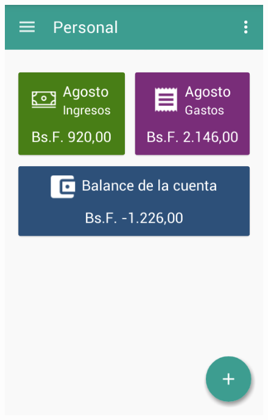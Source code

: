 \begin{figure}[ht]
\centering
\begin{minipage}{.5\textwidth}
  \centering
  \includegraphics[scale=0.45,type=png,ext=.png,read=.png]{imagenes/dashboard}
  \captionsetup{justification=centering}
  \label{fig:interfazDashboard}
\end{minipage}%
\begin{minipage}{.5\textwidth}
\centering

\end{minipage}
\end{figure}
